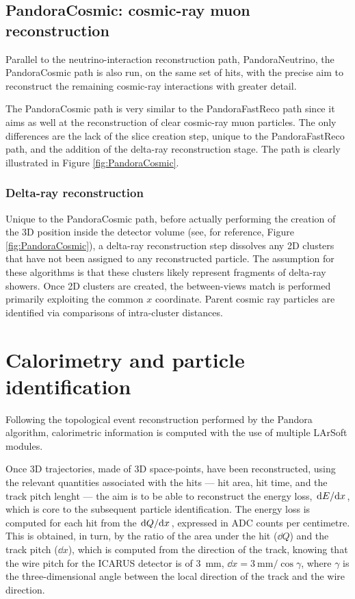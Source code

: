 \subsection{PandoraCosmic: cosmic-ray muon reconstruction}

Parallel to the neutrino-interaction reconstruction path, PandoraNeutrino, the PandoraCosmic path is also run, on the same set of hits, with the precise aim to reconstruct the remaining cosmic-ray interactions with greater detail. 

The PandoraCosmic path is very similar to the PandoraFastReco path since it aims as well at the reconstruction of clear cosmic-ray muon particles. The only differences are the lack of the slice creation step, unique to the PandoraFastReco path, and the addition of the delta-ray reconstruction stage. The path is clearly illustrated in Figure \ref{fig:PandoraCosmic}. 

\subsubsection{Delta-ray reconstruction}

Unique to the PandoraCosmic path, before actually performing the creation of the 3D position inside the detector volume (see, for reference, Figure \ref{fig:PandoraCosmic}), a delta-ray reconstruction step dissolves any 2D clusters that have not been assigned to any reconstructed particle. The assumption for these algorithms is that these clusters likely represent fragments of delta-ray showers. Once 2D clusters are created, the between-views match is performed primarily exploiting the common $x$ coordinate. Parent cosmic ray particles are identified via comparisons of intra-cluster distances. 

\section{Calorimetry and particle identification} 

Following the topological event reconstruction performed by the Pandora algorithm, calorimetric information is computed with the use of multiple LArSoft modules. 

Once 3D trajectories, made of 3D space-points, have been reconstructed, using the relevant quantities associated with the hits --- hit area, hit time, and the track pitch lenght --- the aim is to be able to reconstruct the energy loss, $\dv*{E}{x}$, which is core to the  subsequent particle identification. The energy loss is computed for each hit from the $\dv*{Q}{x}$, expressed in ADC counts per centimetre. This is obtained, in turn, by the ratio of the area under the hit ($\dd Q$) and the track pitch ($\dd x$), which is computed from the direction of the track, knowing that the wire pitch for the ICARUS detector is of \SI{3}{\mm}, $\dd x = \SI{3}{\mm}/\cos\gamma$, where $\gamma$ is the three-dimensional angle between the local direction of the track and the wire direction. 


